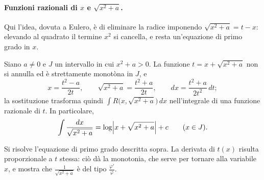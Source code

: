 \paragraph{Funzioni razionali di $x$ e $\sqrt{x^{2}+a}$.} Qui l'idea, dovuta a Eulero, è
di eliminare la radice imponendo $\sqrt{x^{2}+a}=t-x$: elevando al quadrato il termine
$x^{2}$ si cancella, e resta un'equazione di primo grado in $x$.

\begin{proposizione}\label{prop:sostituzione-eulero}
Siano $a\neq0$ e $J$ un intervallo in cui $x^{2}+a>0$. La funzione
$t=x+\sqrt{x^{2}+a}$ non si annulla ed è strettamente monotòna in $J$, e
\begin{equation}\label{eq:sostituzione-eulero}
  x=\frac{t^{2}-a}{2t}, \qquad \sqrt{x^{2}+a}=\frac{t^{2}+a}{2t}, \qquad
  dx=\frac{t^{2}+a}{2t^{2}}\,dt ;
\end{equation}
la sostituzione trasforma quindi $\int R\bigl(x,\sqrt{x^{2}+a}\bigr)\,dx$ nell'integrale
di una funzione razionale di $t$. In particolare,
\begin{equation}\label{eq:integrale-eulero}
  \int\frac{dx}{\sqrt{x^{2}+a}}=\log\Bigl|x+\sqrt{x^{2}+a}\Bigr|+c
  \qquad (x\in J) .
\end{equation}
\end{proposizione}

\begin{schema}
\end{schema}

\begin{strategia}
Si risolve l'equazione di primo grado descritta sopra. La derivata di $t(x)$ risulta
proporzionale a $t$ stessa: ciò dà la monotonia, che serve per tornare alla variabile
$x$, e mostra che $\frac1{\sqrt{x^{2}+a}}$ è del tipo $\frac{\varphi'}\varphi$.
\end{strategia}

